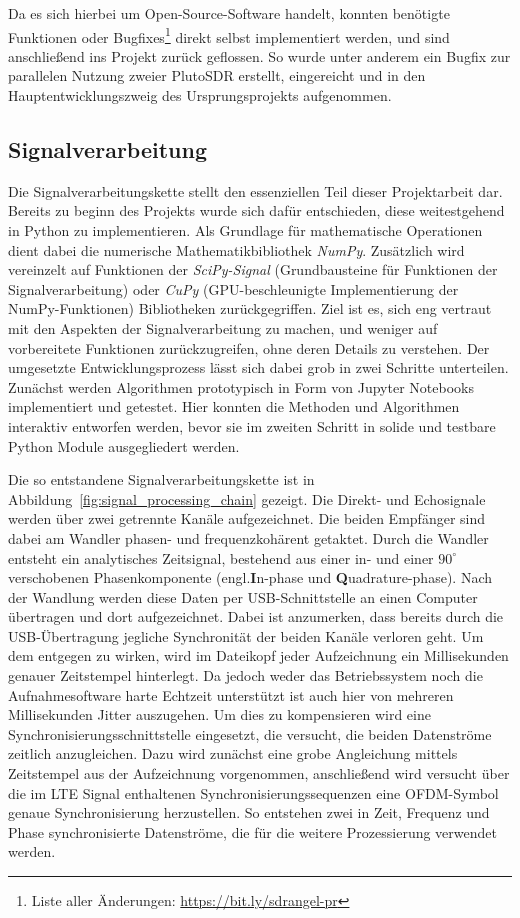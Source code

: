 Da es sich hierbei um Open-Source-Software handelt, konnten benötigte Funktionen oder Bugfixes\footnote{Liste aller Änderungen: \url{https://bit.ly/sdrangel-pr}} direkt selbst implementiert werden, und sind anschließend ins Projekt zurück geflossen. So wurde unter anderem ein Bugfix zur parallelen Nutzung zweier PlutoSDR erstellt, eingereicht und in den Hauptentwicklungszweig des Ursprungsprojekts aufgenommen.

\subsection{Signalverarbeitung}

Die Signalverarbeitungskette stellt den essenziellen Teil dieser Projektarbeit dar. Bereits zu beginn des Projekts wurde sich dafür entschieden, diese weitestgehend in Python zu implementieren. Als Grundlage für mathematische Operationen dient dabei die numerische Mathematikbibliothek \emph{NumPy}. Zusätzlich wird vereinzelt auf Funktionen der \emph{SciPy-Signal} (Grundbausteine für Funktionen der Signalverarbeitung) oder \emph{CuPy} (GPU-beschleunigte Implementierung der NumPy-Funktionen) Bibliotheken zurückgegriffen. Ziel ist es, sich eng vertraut mit den Aspekten der Signalverarbeitung zu machen, und weniger auf vorbereitete Funktionen zurückzugreifen, ohne deren Details zu verstehen. Der umgesetzte Entwicklungsprozess lässt sich dabei grob in zwei Schritte unterteilen. Zunächst werden Algorithmen prototypisch in Form von Jupyter Notebooks implementiert und getestet. Hier konnten die Methoden und Algorithmen interaktiv entworfen werden, bevor sie im zweiten Schritt in solide und testbare Python Module ausgegliedert werden.

Die so entstandene Signalverarbeitungskette ist in Abbildung~\ref{fig:signal_processing_chain} gezeigt. Die Direkt- und Echosignale werden über zwei getrennte Kanäle aufgezeichnet. Die beiden Empfänger sind dabei am Wandler phasen- und frequenzkohärent getaktet. Durch die Wandler entsteht ein analytisches Zeitsignal, bestehend aus einer in- und einer \(90^\circ \) verschobenen Phasenkomponente %
(engl.\@ \textbf{I}n-phase und \textbf{Q}uadrature-phase). %
Nach der Wandlung werden diese Daten per USB-Schnittstelle an einen Computer übertragen und dort aufgezeichnet. Dabei ist anzumerken, dass bereits durch die USB-Übertragung jegliche Synchronität der beiden Kanäle verloren geht. Um dem entgegen zu wirken, wird im Dateikopf jeder Aufzeichnung ein Millisekunden genauer Zeitstempel hinterlegt. Da jedoch weder das Betriebssystem noch die Aufnahmesoftware harte Echtzeit unterstützt ist auch hier von mehreren Millisekunden Jitter auszugehen. Um dies zu kompensieren wird eine Synchronisierungsschnittstelle eingesetzt, die versucht, die beiden Datenströme zeitlich anzugleichen. Dazu wird zunächst eine grobe Angleichung mittels Zeitstempel aus der Aufzeichnung vorgenommen, anschließend wird versucht über die im LTE Signal enthaltenen Synchronisierungssequenzen eine OFDM-Symbol genaue Synchronisierung herzustellen. So entstehen zwei in Zeit, Frequenz und Phase synchronisierte Datenströme, die für die weitere Prozessierung verwendet werden.

